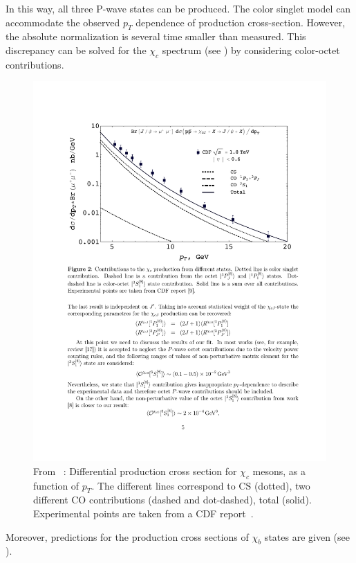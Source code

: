 In this way, all three P-wave states can be produced. The color singlet model
can accommodate the observed $p_T$ dependence of production cross-section.
However, the absolute normalization is several time smaller than measured. This
discrepancy can be solved for the $\chi_c$ spectrum (see )
by considering color-octet contributions.

\begin{figure}
\center
\includegraphics[width=.75\textwidth]{figs/review/chibprod_fig2}
\caption{From ~\cite{Likhoded:2012hw}: Differential production cross section for $\chi_c$ mesons, 
as a function of $p_T$. The different lines correspond to CS (dotted), two different CO 
contributions (dashed and dot-dashed), total (solid). Experimental points are taken from a 
CDF report~\cite{Abulencia:2007bra}.}
\label{fig:chibprod_fig2} 
\end{figure} 

Moreover, predictions for the production cross sections of $\chi_b$ states are
given (see ).

